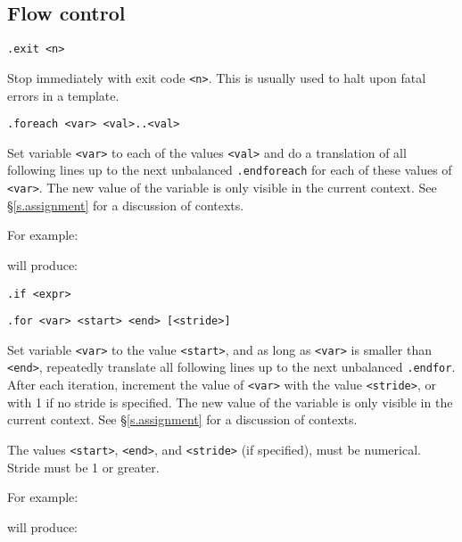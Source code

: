 \subsection{Flow control}
\begin{verbatim}
.exit <n>
\end{verbatim}
\begin{desc}
Stop {\Tm} immediately with exit code \texttt{<n>}.
This is usually used to halt upon fatal errors in a template.
\end{desc}
\begin{verbatim}
.foreach <var> <val>..<val>
\end{verbatim}
\begin{desc}
Set variable \texttt{<var>} to each of the values \texttt{<val>} and do a
translation of all following lines up to the next unbalanced
\texttt{.endforeach} for each of these values of \texttt{<var>}.
The new value of the variable is only visible in the current context.
See \S\ref{s.assignment} for a discussion of contexts.

For example:
\begin{showfile}

\end{showfile}
will produce:
\begin{showfile}

\end{showfile}
\end{desc}
\begin{verbatim}
.if <expr>
\end{verbatim}
\begin{verbatim}
.for <var> <start> <end> [<stride>]
\end{verbatim}
\begin{desc}
Set variable \texttt{<var>} to the value \texttt{<start>},
and as long as \texttt{<var>} is smaller than \texttt{<end>},
repeatedly translate all
following lines up to the next unbalanced
\texttt{.endfor}.
After each iteration, increment the value of
\texttt{<var>} with the value 
\texttt{<stride>}, or with 1 if no stride is specified.
The new value of the variable is only visible in the current context.
See \S\ref{s.assignment} for a discussion of contexts.

The values 
\texttt{<start>},
\texttt{<end>},
and \texttt{<stride>} (if specified), must be numerical.
Stride must be 1 or greater.

For example:
\begin{showfile}

\end{showfile}
will produce:
\begin{showfile}

\end{showfile}
\end{desc}
